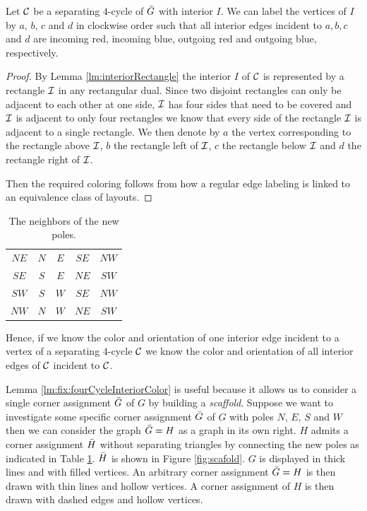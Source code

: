   \begin{lemma}
  \label{lm:fix:fourCycleInteriorColor}
  Let $\mathcal{C}$ be a separating $4$-cycle of $\bar{G}$ with interior $I$. We can label the vertices of $I$ by $a$, $b$, $c$ and $d$ in clockwise order such that all interior edges incident to $a, b, c$ and $d$ are incoming red, incoming blue, outgoing red and outgoing blue, respectively.
  \end{lemma}

  \begin{proof}
  By Lemma \ref{lm:interiorRectangle} the interior $I$ of $\mathcal{C}$ is represented by a rectangle $\mathcal{I}$ in any rectangular dual. Since two disjoint rectangles can only be adjacent to each other at one side, $\mathcal{I}$ has four sides that need to be covered and $\mathcal{I}$ is adjacent to only four rectangles we know that every side of the rectangle $\mathcal{I}$ is adjacent to a single rectangle. We then denote by $a$ the vertex corresponding to the rectangle above $\mathcal{I}$, $b$ the rectangle left of $\mathcal{I}$, $c$ the rectangle below $\mathcal{I}$ and $d$ the rectangle right of $\mathcal{I}$.

  Then the required coloring follows from how a regular edge labeling is linked to an equivalence class of layouts.

  \end{proof}

  \begin{table}
    \centering
    \begin{tabular}{c|| c c c c}
      $NE$ & $N$ & $ E$ & $ SE$ & $ NW$ \\
      $SE$ & $S$ & $ E$ & $ NE$ & $ SW$\\
      $SW$ & $S$ & $ W$ & $ SE$ & $ NW$\\
      $NW$ & $N$ & $ W$ & $ NE$ & $ SW$\\
    \end{tabular}
    \caption{The neighbors of the new poles.}
    \label{tab:scaffold}
  \end{table}

  Hence, if we know the color and orientation of one interior edge incident to a vertex of a separating $4$-cycle $\mathcal{C}$ we know the color and orientation of all interior edges of $\mathcal{C}$ incident to $\mathcal{C}$.

  Lemma \ref{lm:fix:fourCycleInteriorColor} is useful because it allows us to consider a single corner assignment $\bar{G}$ of $G$ by building a \emph{scaffold}. Suppose we want to investigate some specific corner assignment $\bar{G}$ of $G$ with poles $N$, $E$, $S$ and $W$ then we can consider the graph $\bar{G} = H$ as a graph in its own right.
  $H$ admits a corner assignment $\bar{H}$ without separating triangles by connecting the new poles as indicated in Table \ref{tab:scaffold}.
  $\bar{H}$ is shown in Figure \ref{fig:scafold}.
  $G$ is displayed in thick lines and with filled vertices.
  An arbitrary corner assignment $\bar{G} =H$ is then drawn with thin lines and hollow vertices.
  A corner assignment of $H$ is then drawn with dashed edges and hollow vertices.

